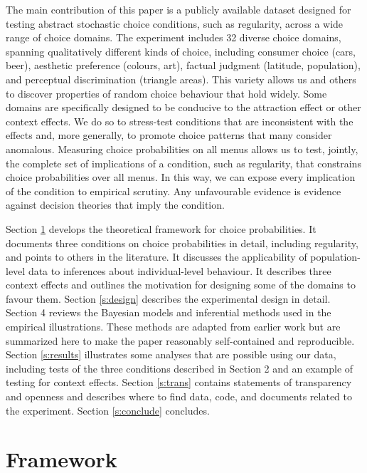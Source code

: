 \documentclass[11pt,letter]{article}
\begin{document}
The main contribution of this paper is a publicly available dataset designed for testing abstract stochastic choice conditions, such as regularity, across a wide range of choice domains.
The experiment includes 32 diverse choice domains, spanning qualitatively different kinds of choice, including consumer choice (cars, beer), aesthetic preference (colours, art), factual judgment (latitude, population), and perceptual discrimination (triangle areas).
This variety allows us and others to discover properties of random choice behaviour that hold widely.
Some domains are specifically designed to be conducive to the attraction effect or other context effects.
We do so to stress-test conditions that are inconsistent with the effects and, more generally, to promote choice patterns that many consider anomalous.
Measuring choice probabilities on all menus allows us to test, jointly, the complete set of implications of a condition, such as regularity, that constrains choice probabilities over all menus.
In this way, we can expose every implication of the condition to empirical scrutiny.
Any unfavourable evidence is evidence against decision theories that imply the condition.

Section \ref{s:framework} develops the theoretical framework for choice probabilities.
It documents three conditions on choice probabilities in detail, including regularity, and points to others in the literature.
It discusses the applicability of population-level data to inferences about individual-level behaviour.
It describes three context effects and outlines the motivation for designing some of the domains to favour them.
Section \ref{s:design} describes the experimental design in detail.
Section 4 reviews the Bayesian models and inferential methods used in the empirical illustrations.
These methods are adapted from earlier work but are summarized here to make the paper reasonably self-contained and reproducible.
Section \ref{s:results} illustrates some analyses that are possible using our data,
including tests of the three conditions described in Section 2 and an example of testing for context effects.
Section \ref{s:trans} contains statements of transparency and openness and describes where to find data, code, and documents related to the experiment.
Section \ref{s:conclude} concludes.

\section{Framework}\label{s:framework}
\end{document}
